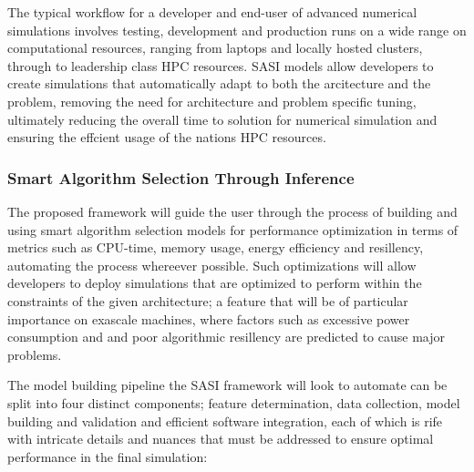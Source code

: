 The typical workflow for a developer and end-user of advanced numerical simulations involves testing, development and production runs on a wide range on computational resources, ranging from laptops and locally hosted clusters, through to leadership class HPC resources. SASI models allow developers to create simulations that automatically adapt to both the arcitecture and the problem, removing the need for architecture and problem specific tuning, ultimately reducing the overall time to solution for numerical simulation and ensuring the effcient usage of the nations HPC resources.  


\subsubsection{Smart Algorithm Selection Through Inference }

The proposed framework will guide the user through the process of building and using smart algorithm selection models for performance optimization in terms of metrics such as CPU-time, memory usage, energy efficiency and resillency, automating the process whereever possible. Such optimizations will allow developers to deploy simulations that are optimized to perform within the constraints of the given architecture; a feature that will be of particular importance on exascale machines, where factors such as excessive power consumption and and poor algorithmic resillency are predicted to cause major problems.

The model building pipeline the SASI framework will look to automate can be split into four distinct components; feature determination, data collection, model building and validation and efficient software integration, each of which is rife with intricate details and nuances that must be addressed to ensure optimal performance in the final simulation:

